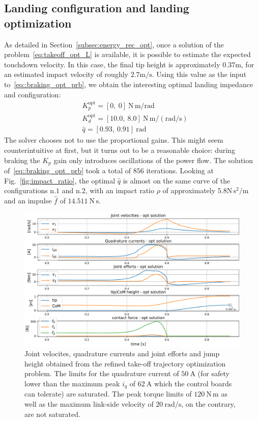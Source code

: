\subsection{Landing configuration and landing optimization}
As detailed in Section~\ref{subsec:energy_rec_opt}, once a solution of the problem~\eqref{eq:takeoff_opt_L} is available, it is possible to estimate the expected touchdown velocity. In this case, the final tip height is approximately $0.37\mathrm{m}$, for an estimated impact velocity of roughly $2.7\mathrm{m/s}$. Using this value as the input to~\eqref{eq::braking_opt_prb}, we obtain the interesting optimal landing impedance and configuration:
\begin{eqnarray}\label{eq:optimal_braking_sol}
&K_p^{\mathrm{opt}} = \left[0,~0\right]~\mathrm{N\,m/rad}\\
&K_d^{\mathrm{opt}} = \left[10.0,~8.0\right]~\mathrm{N\,m/(rad/s)}\\
&\hat{q} = \left[0.93,~0.91\right]~\mathrm{rad}
\end{eqnarray}
The solver chooses not to use the proportional gains. This might seem counterintuitive at first, but it turns out to be a reasonable choice: during braking the $K_p$ gain only introduces oscillations of the power flow.
The solution of~\eqref{eq::braking_opt_prb} took a total of $856$ iterations. Looking at Fig.~\ref{fig:impact_ratio}, the optimal $\hat{q}$ is almost on the same curve of the configurations n.$1$ and n.$2$, with an impact ratio $\rho$ of approximately $5.8\mathrm{N\,s^{2}/m}$ and an impulse $\hat{f}$ of $14.511~\mathrm{N\,s}$.
\begin{figure}[t]
    \centering
    \includegraphics[width=1\columnwidth]{images/hardware_saturation_opt.pdf}
    \caption{Joint velocites, quadrature currents and joint efforts and jump height obtained from the refined take-off trajectory optimization problem. The limits for the quadrature current of $50~\mathrm{A}$ (for safety lower than the maximum peak $i_q$ of $62~\mathrm{A}$ which the control boards can tolerate) are saturated. The peak torque limits of $120~\mathrm{N\,m}$ as well as the maximum link-side velocity of $20~\mathrm{rad/s}$, on the contrary, are not saturated.}
    \label{fig:takeoff_opt_data}
\end{figure}

